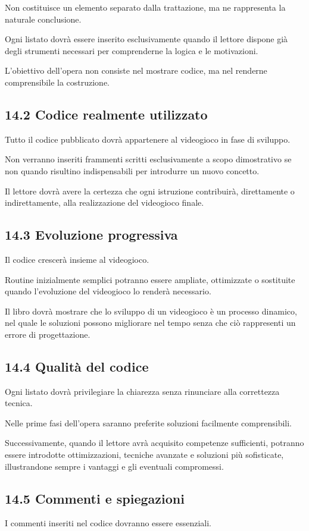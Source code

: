 \documentclass{article}
\begin{document}
Non costituisce un elemento separato dalla trattazione, ma ne rappresenta la naturale conclusione.

Ogni listato dovrà essere inserito esclusivamente quando il lettore dispone già degli strumenti necessari per
comprenderne la logica e le motivazioni.

L'obiettivo dell'opera non consiste nel mostrare codice, ma nel renderne comprensibile la costruzione.

\subsection{14.2 Codice realmente utilizzato}
Tutto il codice pubblicato dovrà appartenere al videogioco in fase di sviluppo.

Non verranno inseriti frammenti scritti esclusivamente a scopo dimostrativo se non quando risultino indispensabili per
introdurre un nuovo concetto.

Il lettore dovrà avere la certezza che ogni istruzione contribuirà, direttamente o indirettamente, alla realizzazione
del videogioco finale.

\subsection{14.3 Evoluzione progressiva}
Il codice crescerà insieme al videogioco.

Routine inizialmente semplici potranno essere ampliate, ottimizzate o sostituite quando l'evoluzione del videogioco lo
renderà necessario.

Il libro dovrà mostrare che lo sviluppo di un videogioco è un processo dinamico, nel quale le soluzioni possono
migliorare nel tempo senza che ciò rappresenti un errore di progettazione.

\subsection{14.4 Qualità del codice}
Ogni listato dovrà privilegiare la chiarezza senza rinunciare alla correttezza tecnica.

Nelle prime fasi dell'opera saranno preferite soluzioni facilmente comprensibili.

Successivamente, quando il lettore avrà acquisito competenze sufficienti, potranno essere introdotte ottimizzazioni,
tecniche avanzate e soluzioni più sofisticate, illustrandone sempre i vantaggi e gli eventuali compromessi.

\subsection{14.5 Commenti e spiegazioni}
I commenti inseriti nel codice dovranno essere essenziali.
\end{document}
